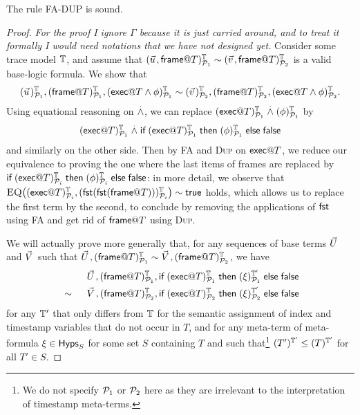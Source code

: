 \begin{proposition}
  The rule \textsc{FA-DUP} is sound.
\end{proposition}
\begin{proof}
  \emph{For the proof I ignore $\Gamma$ because it is just carried around,
  and to treat it formally I would need notations that we have not designed
  yet.}
  Consider some trace model $\mathbb{T}$,
  and assume that
  $(\pvec u,\mframe @ T)^\TM_{\calp_1} \sim
   (\pvec v,\mframe @ T)^\TM_{\calp_2}$
  is a valid base-logic formula.
  We show that
  $$
  \interp{\pvec u}{\TM}{\calp_1},
  \interp{\mframe @ T}{\TM}{\calp_1},
  (\mexec @ T \wedge \phi)^\TM_{\calp_1}
  \sim
  \interp{\pvec v}{\TM}{\calp_2},
  \interp{\mframe @ T}{\TM}{\calp_2},
  (\mexec @ T \wedge \phi)^\TM_{\calp_2}.
  $$
  Using equational reasoning on $\stackrel{.}{\wedge}$, we can replace
  $(\textsf{exec} @ T)^{\mathbb{T}}_{\mathcal{P}_1} \stackrel{.}{\wedge} (\phi)^{\mathbb{T}}_{\mathcal{P}_1}$ by
  $$(\textsf{exec} @ T)^{\mathbb{T}}_{\mathcal{P}_1} \stackrel{.}{\wedge}
  \textsf{if}\; (\textsf{exec} @ T)^{\mathbb{T}}_{\mathcal{P}_1}
  \;\textsf{then}\; (\phi)^{\mathbb{T}}_{\mathcal{P}_1} \;\textsf{else}\; \textsf{false}$$
  and similarly on the other side.
  Then by \textsc{FA} and \textsc{Dup} on $\textsf{exec} @ T$,
  we reduce our equivalence to proving the one where the last items
  of frames are replaced by
  $
  \textsf{if}\; (\textsf{exec} @ T)^{\mathbb{T}}_{\mathcal{P}_i}
  \;\textsf{then}\; (\phi)^{\mathbb{T}}_{\mathcal{P}_i} \;\textsf{else}\; \textsf{false}
  $:
  in more detail, we observe that
  $\textsc{EQ}\bigl((\textsf{exec} @ T)^{\mathbb{T}}_{\mathcal{P}_i},
       (\mathsf{fst}(\mathsf{fst}(\textsf{frame} @ T)))^{\mathbb{T}}_{\mathcal{P}_i}\bigr)\sim\textsf{true}$
  holds, which allows us to replace the first term by the second,
  to conclude by removing the applications of $\mathsf{fst}$ using \textsc{FA}
  and get rid of $\textsf{frame} @ T$ using \textsc{Dup}.

  We will actually prove more generally that, for any sequences
  of base terms $\pvec U$ and $\pvec V$ such that
  $\pvec U,
   \interp{\mframe @ T}{\TM}{\calp_1} \sim
   \pvec V,
   \interp{\mframe @ T}{\TM}{\calp_2}$, we have
  \begin{alignat*}{2}
      &&&
      \pvec U,
      \interp{\mframe @ T}{\TM}{\calp_1},
      \myif \interp{\mexec @ T}{\TM}{\calp_1}
      \mythen \interp{\xi}{\TM'}{\calp_1} \myelse \false
      \\ &\sim\;\; &&
      \pvec V,
      \interp{\mframe @ T}{\TM}{\calp_2},
      \myif \interp{\mexec @ T}{\TM}{\calp_2}
      \mythen \interp{\xi}{\TM'}{\calp_2} \myelse \false
    \end{alignat*}
  for any $\mathbb{T}'$ that only differs from $\mathbb{T}$ for the semantic
  assignment of index and timestamp variables that do not occur in $T$,
  and for any meta-term of meta-formula $\xi \in \textsf{Hyps}_S$
  for some set $S$ containing $T$ and such that\footnote{
    We do not specify $\mathcal{P}_1$ or $\mathcal{P}_2$ here
    as they are irrelevant to the interpretation of timestamp meta-terms.
  } $(T')^{\mathbb{T}'}_{}\leq(T)^{\mathbb{T}'}_{}$ for all $T'\in S$.


\end{proof}
